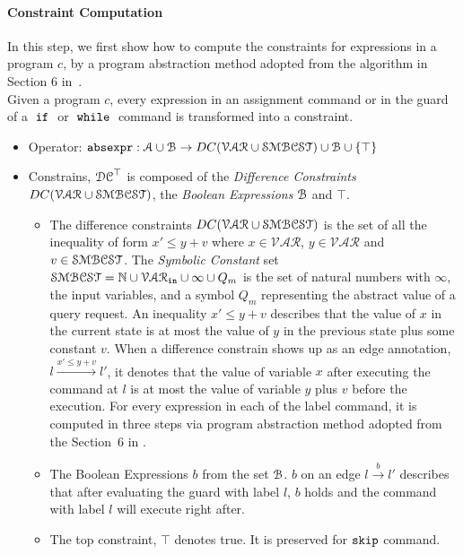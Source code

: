 \paragraph{Constraint Computation}
In this step, we first show how to compute the constraints for expressions in a program $c$,
by a program abstraction method adopted from the
algorithm in Section 6 in~\cite{sinn2017complexity}.
\\
Given a program $c$,
every expression in an assignment command or in the guard of a $\;\mathtt{if}\;$ or $\;\mathtt{while}\;$ command
is transformed into a constraint.

\begin{itemize}
\item Operator: $\mathtt{abs}{\mathtt{expr}} : \mathcal{A} \cup \mathcal{B} \to DC(\mathcal{VAR}  \cup \mathcal{SMBCST})\cup \mathcal{B} \cup \{\top\}$
%
\item Constrains, $\mathcal{DC}^{\top}$ is composed of the \emph{Difference Constraints} $DC(\mathcal{VAR}  \cup \mathcal{SMBCST})$, the \emph{Boolean Expressions} $\mathcal{B}$ and $\top$.
%
\begin{itemize}
\item The difference constraints $DC(\mathcal{VAR}  \cup \mathcal{SMBCST})$ is the set of all the inequality of
form $x' \leq y + v$ where $x \in \mathcal{VAR} $, 
$y \in \mathcal{VAR}$ and $v \in \mathcal{SMBCST}$.
The \emph{Symbolic Constant} set $\mathcal{SMBCST} = \mathbb{N} \cup \mathcal{VAR}_{\mathtt{in}} \cup{\infty \cup{Q_m}}$
is the set of natural numbers with $\infty$, the input variables, and a symbol $Q_m$ representing the abstract value of a query request.
An inequality $x' \leq y + v$ describes that the value of $x$ in the current state is
at most the value of $y$ in the previous state plus some constant $v$.
When a difference constrain shows up as an edge annotation, $l \xrightarrow{x' \leq y + v} l'$,
it denotes that
the value of variable $x$
after executing the command at $l$ is at most
the value of variable $y$ plus $v$ before the execution.
For every expression in each of the label command, it is computed in three steps via program abstraction method adopted from the Section~6 in \cite{sinn2017complexity}. 
%
\item The Boolean Expressions $b$ from the set $\mathcal{B}$.
$b$ on an edge $l \xrightarrow{b} l'$ describes
that after evaluating the guard with label $l$,
$b$ holds and the command with label $l$ will execute right after.
%
\item The top constraint, $\top$ denotes true. It is preserved for $\mathtt{skip}$ command.
%
\end{itemize}
\end{itemize}

